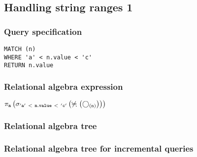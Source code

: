 \subsection{Handling string ranges 1}

\subsubsection*{Query specification}

\begin{lstlisting}
MATCH (n)
WHERE 'a' < n.value < 'c'
RETURN n.value
\end{lstlisting}

\subsubsection*{Relational algebra expression}

$\projection{\var{n}} \left(\selection{\mathtt{'a'~<~n.value~<~'c'}} \left(\alldifferent{} \left(\getvertices{n}{}\right)\right)\right)$

\subsubsection*{Relational algebra tree}


\subsubsection*{Relational algebra tree for incremental queries}


